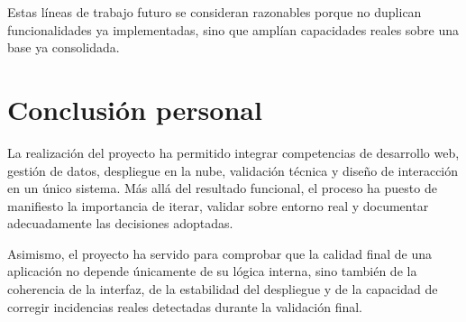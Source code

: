 Estas líneas de trabajo futuro se consideran razonables porque no duplican funcionalidades ya implementadas, sino que amplían capacidades reales sobre una base ya consolidada.

\section{Conclusión personal}

La realización del proyecto ha permitido integrar competencias de desarrollo web, gestión de datos, despliegue en la nube, validación técnica y diseño de interacción en un único sistema. Más allá del resultado funcional, el proceso ha puesto de manifiesto la importancia de iterar, validar sobre entorno real y documentar adecuadamente las decisiones adoptadas.

Asimismo, el proyecto ha servido para comprobar que la calidad final de una aplicación no depende únicamente de su lógica interna, sino también de la coherencia de la interfaz, de la estabilidad del despliegue y de la capacidad de corregir incidencias reales detectadas durante la validación final.
